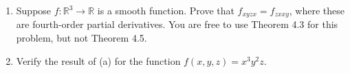 \begin{problem}
\begin{enumerate}
\item Suppose $f:\mathbb{R}^3\rightarrow\mathbb{R}$ is a smooth function. Prove that $f_{xyzx} = f_{zxxy}$, where these are fourth-order partial derivatives. You are free to use Theorem 4.3 for this problem, but not Theorem 4.5.
\item Verify the result of (a) for the function $f(x,y,z) = x^3y^2z$.
\end{enumerate}
\end{problem}